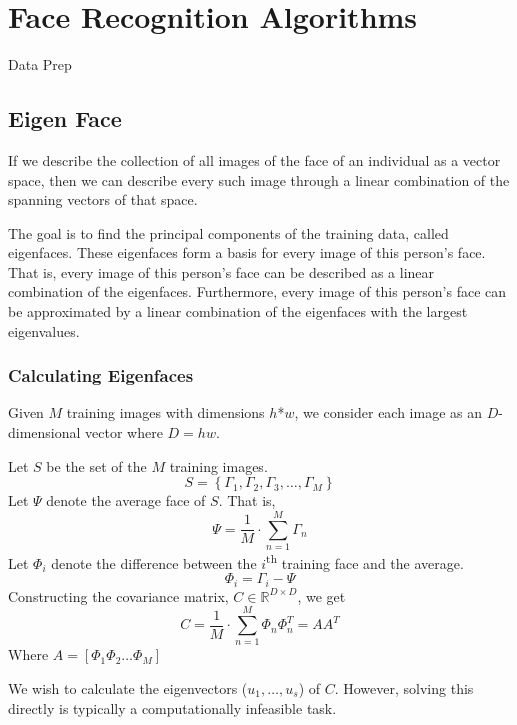 \documentclass{article}
\begin{document}
\section{Face Recognition Algorithms}
Data Prep

\subsection{Eigen Face}
If we describe the collection of all images of the face of an individual as a vector space, then we can describe every such image through a linear combination of the spanning vectors of that space.

The goal is to find the principal components of the training data, called eigenfaces. These eigenfaces form a basis for every image of this person’s face. That is, every image of this person’s face can be described as a linear combination of the eigenfaces. Furthermore, every image of this person’s face can be approximated by a linear combination of the eigenfaces with the largest eigenvalues.

\subsubsection{Calculating Eigenfaces}
Given $M$ training images with dimensions $h$*$w$, we consider each image as an $D$-dimensional vector where $D = hw$.

\vspace{12pt} \noindent Let $S$ be the set of the $M$ training images.
\begin{equation}
	S = \left\{\Gamma_1, \Gamma_2, \Gamma_3, \ldots, \Gamma_M\right\}
\end{equation}
Let $\Psi$ denote the average face of $S$. That is,
\begin{equation}
	\Psi = \frac{1}{M}\cdot\sum_{n=1}^{M}\Gamma_n
\end{equation}
Let $\Phi_i$ denote the difference between the $i$\textsuperscript{th} training face and the average.
\begin{equation}
	\Phi_i = \Gamma_i - \Psi
\end{equation}
Constructing the covariance matrix, $C \in \mathbb{R}^{D\times D}$, we get
\begin{equation}
	C = \frac{1}{M}\cdot\sum_{n=1}^{M}\Phi_n \Phi_n^T
	  = AA^T
\end{equation}
Where $A = [\Phi_1 \Phi_2 \ldots \Phi_M]$

We wish to calculate the eigenvectors ($u_1, \ldots, u_s$) of $C$. However, solving this directly is typically a computationally infeasible task.
\end{document}
